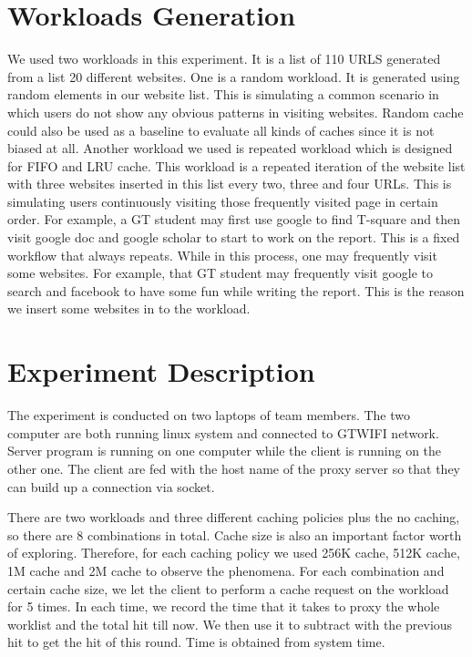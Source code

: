 \documentclass[paper=a4, fontsize=11pt]{scrartcl} %
\numberwithin{equation}{section} %
\numberwithin{figure}{section} %
\numberwithin{table}{section} %
\begin{document}
\section{Workloads Generation}

We used two workloads in this experiment. It is a list of 110 URLS generated from a list 20 different websites. One is a random workload. It is generated using random elements in our website list. This is simulating a common scenario in which users do not show any obvious patterns in visiting websites. Random cache could also be used as a baseline to evaluate all kinds of caches since it is not biased at all. Another workload we used is repeated workload which is designed for FIFO and LRU cache. This workload is a repeated iteration of the website list with three websites inserted in this list every two, three and four URLs. This is simulating users continuously visiting those frequently visited page in certain order. For example, a GT student may first use google to find T-square and then visit google doc and google scholar to start to work on the report. This is a fixed workflow that always repeats. While in this process, one may frequently visit some websites. For example, that GT student may frequently visit google to search and facebook to have some fun while writing the report. This is the reason we insert some websites in to the workload.  
    

\section{Experiment Description}

The experiment is conducted on two laptops of team members. The two computer are both running linux system and connected to GTWIFI network. Server program is running on one computer while the client is running on the other one. The client are fed with the host name of the proxy server so that they can build up a connection via socket. 

There are two workloads and three different caching policies plus the no caching, so there are 8 combinations in total. Cache size is also an important factor worth of exploring. Therefore, for each caching policy we used 256K cache, 512K cache, 1M cache and 2M cache to observe the phenomena. For each combination and certain cache size, we let the client to perform a cache request on the workload for 5 times. In each time, we record the time that it takes to proxy the whole worklist and the total hit till now. We then use it to subtract with the previous hit to get the hit of this round. Time is obtained from system time. 
\end{document}
